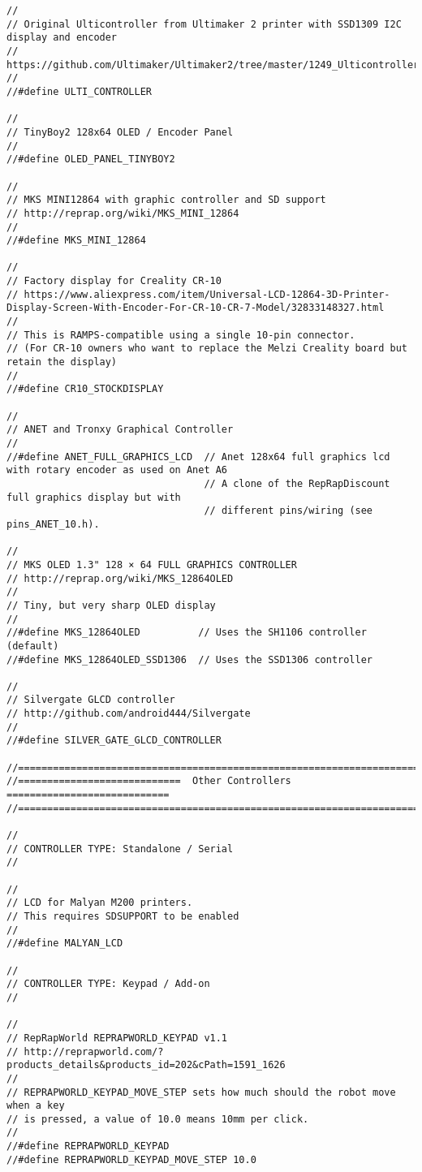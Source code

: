 \begin{lstlisting}
//
// Original Ulticontroller from Ultimaker 2 printer with SSD1309 I2C display and encoder
// https://github.com/Ultimaker/Ultimaker2/tree/master/1249_Ulticontroller_Board_(x1)
//
//#define ULTI_CONTROLLER

//
// TinyBoy2 128x64 OLED / Encoder Panel
//
//#define OLED_PANEL_TINYBOY2

//
// MKS MINI12864 with graphic controller and SD support
// http://reprap.org/wiki/MKS_MINI_12864
//
//#define MKS_MINI_12864

//
// Factory display for Creality CR-10
// https://www.aliexpress.com/item/Universal-LCD-12864-3D-Printer-Display-Screen-With-Encoder-For-CR-10-CR-7-Model/32833148327.html
//
// This is RAMPS-compatible using a single 10-pin connector.
// (For CR-10 owners who want to replace the Melzi Creality board but retain the display)
//
//#define CR10_STOCKDISPLAY

//
// ANET and Tronxy Graphical Controller
//
//#define ANET_FULL_GRAPHICS_LCD  // Anet 128x64 full graphics lcd with rotary encoder as used on Anet A6
                                  // A clone of the RepRapDiscount full graphics display but with
                                  // different pins/wiring (see pins_ANET_10.h).

//
// MKS OLED 1.3" 128 × 64 FULL GRAPHICS CONTROLLER
// http://reprap.org/wiki/MKS_12864OLED
//
// Tiny, but very sharp OLED display
//
//#define MKS_12864OLED          // Uses the SH1106 controller (default)
//#define MKS_12864OLED_SSD1306  // Uses the SSD1306 controller

//
// Silvergate GLCD controller
// http://github.com/android444/Silvergate
//
//#define SILVER_GATE_GLCD_CONTROLLER

//=============================================================================
//============================  Other Controllers  ============================
//=============================================================================

//
// CONTROLLER TYPE: Standalone / Serial
//

//
// LCD for Malyan M200 printers.
// This requires SDSUPPORT to be enabled
//
//#define MALYAN_LCD

//
// CONTROLLER TYPE: Keypad / Add-on
//

//
// RepRapWorld REPRAPWORLD_KEYPAD v1.1
// http://reprapworld.com/?products_details&products_id=202&cPath=1591_1626
//
// REPRAPWORLD_KEYPAD_MOVE_STEP sets how much should the robot move when a key
// is pressed, a value of 10.0 means 10mm per click.
//
//#define REPRAPWORLD_KEYPAD
//#define REPRAPWORLD_KEYPAD_MOVE_STEP 10.0


\end{lstlisting}

